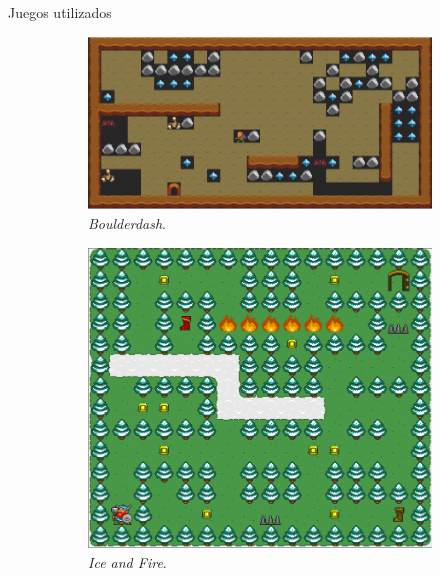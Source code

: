 \documentclass[11pt]{beamer}    %
\begin{document}
    \begin{frame}{Juegos utilizados}
        \begin{figure}
            \centering
            \begin{subfigure}[t]{.5\textwidth}
                \centering
                \includegraphics[scale=0.22]{img/presentation/boulderdash.png}
                \caption{\textit{Boulderdash}.}
            \end{subfigure}%
            \begin{subfigure}[t]{.5\textwidth}
                \centering
                \includegraphics[scale=0.18]{img/presentation/ice_and_fire.png}
                \caption{\textit{Ice and Fire}.}
            \end{subfigure}
            \par\bigskip
            \begin{subfigure}[t]{0.5\textwidth}

\end{subfigure}
\end{figure}
\end{frame}
\end{document}
